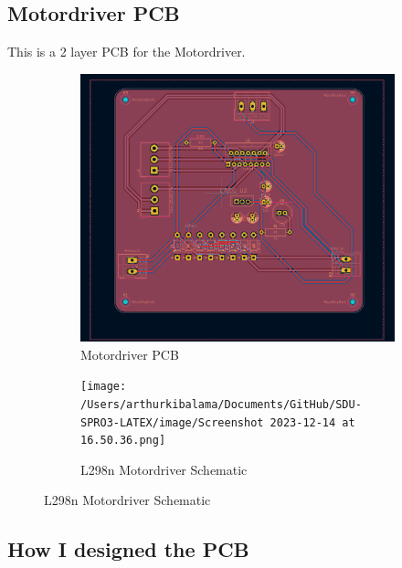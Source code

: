 \documentclass[../report.tex]{subfiles}
\begin{document}
\subsection{Motordriver PCB}
This is a 2 layer PCB for the Motordriver. 
\begin{figure}[H]
    \centering
    \begin{subfigure}[b]{0.4\linewidth}
      \includegraphics[width=\linewidth]{image/Screenshot 2023-12-14 at 16.22.46.png}
      \caption{Motordriver PCB} 
    \end{subfigure}
    \begin{subfigure}[b]{0.4\linewidth}
      \texttt{[image: /Users/arthurkibalama/Documents/GitHub/SDU-SPRO3-LATEX/image/Screenshot 2023-12-14 at 16.50.36.png]}
      \caption{L298n Motordriver Schematic}
    \end{subfigure}
  \end{figure}
  \subsection*{How I designed the PCB}
\end{document}
